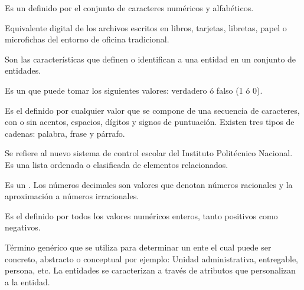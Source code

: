 \begin{description}
	
	 Es un  definido por el conjunto de caracteres numéricos y alfabéticos.
	
	 Equivalente digital de los archivos escritos en libros, tarjetas, libretas, papel o microfichas del entorno de oficina tradicional.
	
	 Son las características que definen o identifican a una entidad en un conjunto de entidades.
	
	 Es un  que puede tomar los siguientes valores: verdadero ó falso (1 ó 0).
	
	 Es el  definido por cualquier valor que se compone de una secuencia de caracteres, con o sin acentos, espacios, dígitos y signos de puntuación. Existen tres tipos de cadenas: palabra, frase y párrafo.
	
	 Se refiere al nuevo sistema de control escolar del Instituto Politécnico Nacional.
	 Es una lista ordenada o clasificada de elementos relacionados.
	
	 Es un  . Los números decimales son valores que denotan números racionales y la aproximación a números irracionales.
	
	 Es el   definido por todos los valores numéricos enteros, tanto positivos como negativos.
	
	 Término genérico que se utiliza para determinar un ente el cual puede ser concreto, abstracto o conceptual por ejemplo: Unidad administrativa, entregable, persona, etc. La entidades se caracterizan a través de atributos que personalizan a la entidad.	
		
	

\end{description}
